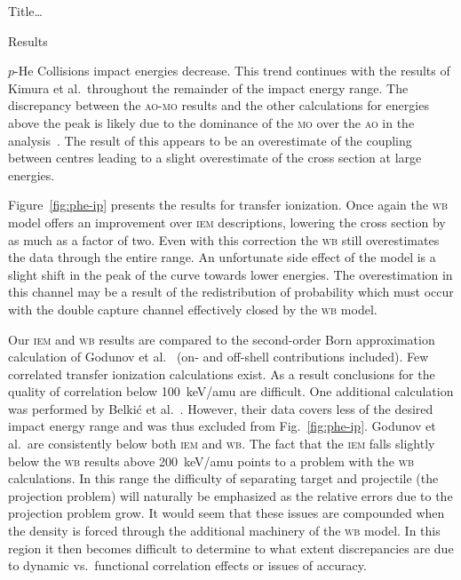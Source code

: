 \documentclass[letterpaper, 10 pt]{report}
\begin{document}
\begin{chapter}{ Title\dots \label{chap:p-he2p-he}}
\begin{section}{Results \label{sec:phe2p-res}}
\begin{subsection}{\texorpdfstring{$p$}{p}-He Collisions \label{sec:phe-res}}
         impact energies decrease. This trend continues with the results of Kimura et al.\ throughout
         the remainder of the impact energy range. The discrepancy between the \textsc{ao-mo} results
         and the other calculations for energies above the peak is likely due to the dominance of the
         \textsc{mo} over the \textsc{ao} in the analysis~\cite{KL-86}. The result of this appears to be
         an overestimate of the coupling between centres leading to a slight overestimate of the cross
         section at large energies.

         Figure~\ref{fig:phe-ip} presents the results for transfer ionization. Once again the
         \textsc{wb} model offers an improvement over \textsc{iem} descriptions, lowering the cross
         section by as much as a factor of two. Even with this correction the \textsc{wb} still
         overestimates the data through the entire range. An unfortunate side effect of the model is a
         slight shift in the peak of the curve towards lower energies. The overestimation in this
         channel may be a result of the redistribution of probability which must occur with the double
         capture channel effectively closed by the \textsc{wb} model.
 
         Our \textsc{iem} and \textsc{wb} results are compared to the second-order Born approximation
         calculation of Godunov et al.~\cite{Godunov-06} (on- and off-shell contributions included). Few
         correlated transfer ionization calculations exist. As a result conclusions for the quality of
         correlation below 100~keV/amu are difficult. One additional calculation was performed by
         Belki\'{c} et al.~\cite{BM-11}. However, their data covers less of the desired impact
         energy range and was thus excluded from Fig.~\ref{fig:phe-ip}. Godunov et al.\ are
         consistently below both \textsc{iem} and \textsc{wb}. The fact that the \textsc{iem} falls
         slightly below the \textsc{wb} results above 200~keV/amu points to a problem with the
         \textsc{wb} calculations. In this range the difficulty of separating target and projectile (the
         projection problem) will naturally be emphasized as the relative errors due to the projection
         problem grow. It would seem that these issues are compounded when the density is forced through
         the additional machinery of the \textsc{wb} model. In this region it then becomes difficult to
         determine to what extent discrepancies are due to dynamic vs.\ functional correlation effects
         or issues of accuracy.


\end{subsection}
\end{section}
\end{chapter}
\end{document}
